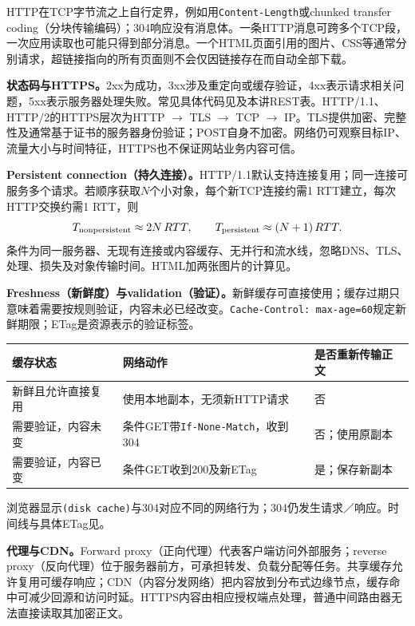 HTTP在TCP字节流之上自行定界，例如用\texttt{Content-Length}或chunked transfer coding（分块传输编码）；304响应没有消息体。一条HTTP消息可跨多个TCP段，一次应用读取也可能只得到部分消息。一个HTML页面引用的图片、CSS等通常分别请求，超链接指向的所有页面则不会仅因链接存在而自动全部下载。

\textbf{状态码与HTTPS。}2xx为成功，3xx涉及重定向或缓存验证，4xx表示请求相关问题，5xx表示服务器处理失败。常见具体代码见及本讲REST表。HTTP/1.1、HTTP/2的HTTPS层次为HTTP $\to$ TLS $\to$ TCP $\to$ IP。TLS提供加密、完整性及通常基于证书的服务器身份验证；POST自身不加密。网络仍可观察目标IP、流量大小与时间特征，HTTPS也不保证网站业务内容可信。


\textbf{Persistent connection（持久连接）。}HTTP/1.1默认支持连接复用；同一连接可服务多个请求。若顺序获取$N$个小对象，每个新TCP连接约需1 RTT建立，每次HTTP交换约需1 RTT，则
\[
 T_{\rm nonpersistent}\approx2N\,RTT,\qquad
 T_{\rm persistent}\approx(N+1)\,RTT.
\]
条件为同一服务器、无现有连接或内容缓存、无并行和流水线，忽略DNS、TLS、处理、损失及对象传输时间。HTML加两张图片的计算见。

\textbf{Freshness（新鲜度）与validation（验证）。}新鲜缓存可直接使用；缓存过期只意味着需要按规则验证，内容未必已经改变。\texttt{Cache-Control: max-age=60}规定新鲜期限；ETag是资源表示的验证标签。
\begin{center}
\small
\begin{tabularx}{\textwidth}{@{}p{3.2cm}XX@{}}
\toprule
缓存状态 & 网络动作 & 是否重新传输正文 \\
\midrule
新鲜且允许直接复用 & 使用本地副本，无须新HTTP请求 & 否 \\
需要验证，内容未变 & 条件GET带\texttt{If-None-Match}，收到304 & 否；使用原副本 \\
需要验证，内容已变 & 条件GET收到200及新ETag & 是；保存新副本 \\
\bottomrule
\end{tabularx}
\end{center}
浏览器显示\texttt{(disk cache)}与304对应不同的网络行为；304仍发生请求／响应。时间线与具体ETag见。

\textbf{代理与CDN。}Forward proxy（正向代理）代表客户端访问外部服务；reverse proxy（反向代理）位于服务器前方，可承担转发、负载分配等任务。共享缓存允许复用可缓存响应；CDN（内容分发网络）把内容放到分布式边缘节点，缓存命中可减少回源和访问时延。HTTPS内容由相应授权端点处理，普通中间路由器无法直接读取其加密正文。

